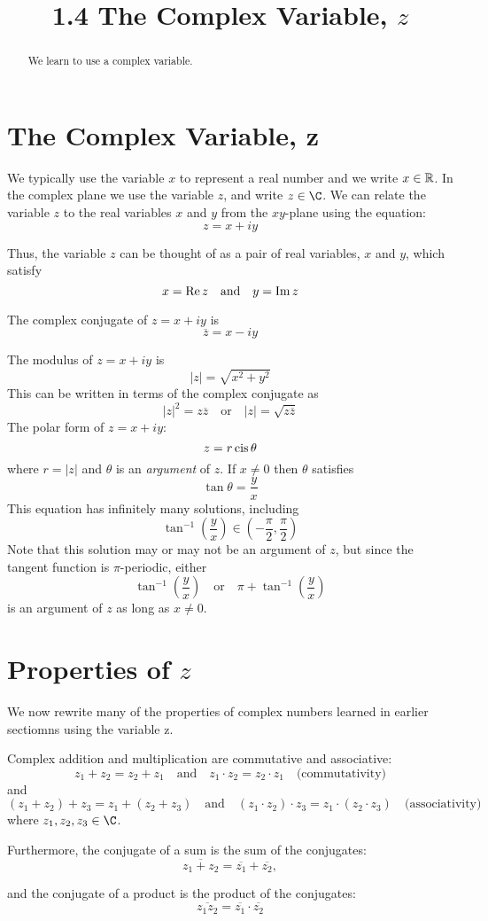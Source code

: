 \documentclass[handout]{ximera}
\title{1.4 The Complex Variable, $z$}
\begin{document}
\begin{abstract}
We learn to use a complex variable.
\end{abstract}

\maketitle

\section{The Complex Variable, z}

We typically use the variable $x$ to represent a real number and we write $x \in \mathbb R$.
In the complex plane we use the variable $z$, and write $z \in \C$. We can relate the variable $z$ to the real variables $x$ and $y$
from the $xy$-plane using the equation:
\[
z = x+iy
\]

Thus, the variable $z$ can be thought of as a pair of real variables, $x$ and $y$, 
which satisfy
\[
x = \operatorname{Re}{z} \quad \mbox{and} \quad y = \operatorname{Im}{z}
\]

The complex conjugate of $z = x+iy$ is
\[
\overline{z} = x-iy
\]

The modulus of $z = x+iy$ is
\[
|z| = \sqrt{x^2 + y^2}
\]
This can be written in terms of the complex conjugate as
\[
|z|^2 = z\overline{z} \quad \mbox{or} \quad |z| = \sqrt{z\overline{z}}
\]
The polar form of $z = x+iy$:
\[
z = r \operatorname{cis} \theta
\]
where $r = |z|$ and $\theta$ is an {\it argument} of $z$. If $x \neq 0$ then $\theta$ satisfies
\[
\tan \theta = \frac{y}{x}
\]
This equation has infinitely many solutions, including
\[ 
\tan^{-1} \left(\frac{y}{x}\right) \in \left(-\frac{\pi}{2}, \frac{\pi}{2}\right)
\]
Note that this solution may or may not be an argument of $z$, but since the tangent function is $\pi$-periodic,
either
\[
\tan^{-1} \left(\frac{y}{x}\right) \quad \mbox{or} \quad \pi + \tan^{-1} \left(\frac{y}{x}\right)
\]
is an argument of $z$ as long as $x \neq 0$.


\section{Properties of $z$}


We now rewrite many of the properties of complex numbers learned in earlier sectiomns using the variable z.


Complex addition and multiplication are commutative and associative: 
\[
z_1 + z_2 = z_2 + z_1 \quad \mbox{and} \quad z_1 \cdot z_2 = z_2 \cdot z_1 \quad \mbox{(commutativity)}
\]
and
\[
(z_1 + z_2) + z_3  = z_1 + (z_2 + z_3) \quad \mbox{and} \quad (z_1 \cdot z_2) \cdot z_3  = z_1 \cdot (z_2 \cdot z_3) \quad \mbox{(associativity)}
\]
where $z_1, z_2, z_3 \in \C$.

Furthermore, the conjugate of a sum is the sum of the conjugates:
\[
\overline{z_1 + z_2} = \overline{z_1} + \overline{z_2},
\]

and the conjugate of a product is the product of the conjugates:
\[
\overline{z_1 z_2} = \overline{z_1} \cdot \overline{z_2}
\]
\end{document}
